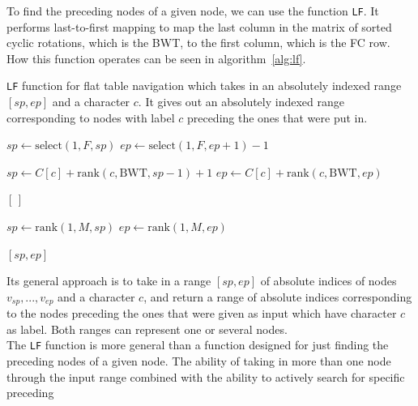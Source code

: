 \documentclass[a4paper,12pt,twoside,BCOR=10mm]{scrbook}
\begin{document}
To find the preceding nodes of a given node,
we can use the function \texttt{LF}. It performs last-to-first mapping to
map the last column in the matrix of sorted cyclic rotations, which is the BWT,
to the first column, which is the FC row.
How this function operates can be seen in algorithm~\ref{alg:lf}.
\begin{algorithm}
\caption[\texttt{LF} function for flat table navigation]{\texttt{LF} function for flat table navigation which takes in an absolutely indexed range $ [ sp, ep ] $ and a character $ c $. It gives out an absolutely indexed range corresponding to nodes with label $ c $ preceding the ones that were put in.}
\label{alg:lf}
\begin{algorithmic}[1]

\State $ sp \gets \textrm{select}(1, F, sp) $
\State $ ep \gets \textrm{select}(1, F, ep + 1) - 1 $

\State \phantom{nl}

\State $ sp \gets C [ c ] + \textrm{rank}(c, \textrm{BWT}, sp - 1) + 1 $
\State $ ep \gets C [ c ] + \textrm{rank}(c, \textrm{BWT}, ep) $

\State \phantom{nl}

	\State \Return $ [ \, ] $
\EndIf

\State \phantom{nl}

\State $ sp \gets \textrm{rank}(1, M, sp) $
\State $ ep \gets \textrm{rank}(1, M, ep) $

\State \phantom{nl}

\State \Return $ [ sp, ep ] $

\end{algorithmic}
\end{algorithm}
Its general approach is to take in a range $ [ sp, ep ] $ of absolute indices of
nodes $ v_{sp}, ..., v_{ep} $ and a character $ c $,
and return a range of absolute indices corresponding to the nodes
preceding the ones that were given as input which have character $ c $ as label.
Both ranges can represent one or several nodes. \\
The \texttt{LF} function is more general than a function designed for just finding the
preceding nodes of a given node. The ability of taking in more than one node through
the input range combined with the ability to actively search for specific preceding
\end{document}
